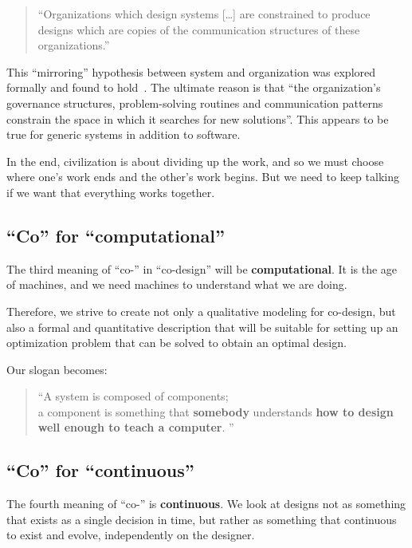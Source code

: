 \begin{quote}
    \enquote{Organizations which design systems [\dots] are constrained to produce designs which are copies of the communication structures of these organizations.}
\end{quote}

This ``mirroring'' hypothesis between system and organization was explored formally and found to hold~\cite{maccormack12exploring}.
The ultimate reason is that ``the organization's governance structures, problem-solving routines and communication patterns constrain the space in which it searches for new solutions''.
This appears to be true for generic systems in addition to software.

In the end, civilization is about dividing up the work, and so we must choose where one's work ends and the other's work begins.
But we need to keep talking if we want that everything works together.

\subsection{``Co'' for ``computational''}

The third meaning of ``co-'' in ``co-design'' will be \textbf{computational}.
It is the age of machines, and we need machines to understand what we are doing.

Therefore, we strive to create not only a qualitative modeling for co-design, but also a formal and quantitative description that will be suitable for setting up an optimization problem that can be solved to obtain an optimal design.

Our slogan becomes:

\begin{quote}
    \enquote{A system is composed of components;\\
        a component is something that \textbf{somebody} understands
        \textbf{how to design} \textbf{well enough to teach a computer}.
    }
\end{quote}

\subsection{``Co'' for ``continuous''}

The fourth meaning of ``co-'' is \textbf{continuous}.
We look at designs not as something that exists as a single decision in time, but rather as something that continuous to exist and evolve, independently on the designer.


